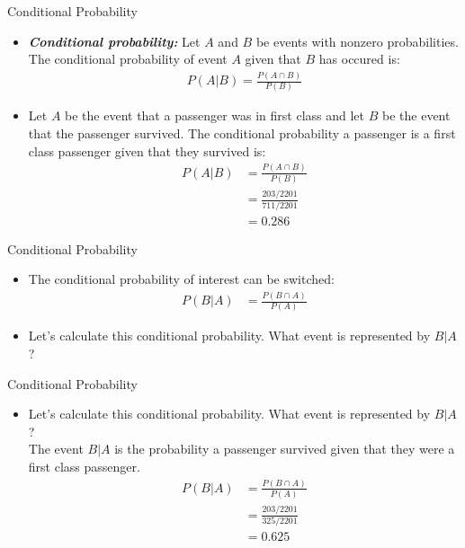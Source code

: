 \documentclass[xcolor=dvipsnames]{beamer}
\begin{document}
\begin{frame}{Conditional Probability}
	\begin{itemize}
		\item \textbf{\emph{Conditional probability:}} Let $A$ and $B$ be events with nonzero probabilities. The conditional probability of event $A$ given that $B$ has occured is:
		\begin{gather*}
		P(A|B) = \frac{P(A \cap B)}{P(B)}
		\end{gather*}
		\item Let $A$ be the event that a passenger was in first class and let $B$ be the event that the passenger survived. The conditional probability a passenger is a first class passenger given that they survived is:
		\begin{align*}
		P(A|B) &= \frac{P(A \cap B)}{P(B)} \\
		&=\frac{203 / 2201}{711 / 2201}\\ 
		&= 0.286
		\end{align*}
	\end{itemize}
\end{frame}

\begin{frame}{Conditional Probability}
\begin{itemize}
	\item The conditional probability of interest can be switched: 
	\begin{align*}
	P(B|A) &= \frac{P(B \cap A)}{P(A)}
	\end{align*}
	\item Let's calculate this conditional probability. What event is represented by $B|A$?
\end{itemize}
\end{frame}

\begin{frame}{Conditional Probability}
\begin{itemize}
	\item Let's calculate this conditional probability. What event is represented by $B|A$? \\
	
	The event $B|A$ is the probability a passenger survived given that they were a first class passenger.
	\begin{align*}
	P(B|A) &= \frac{P(B \cap A)}{P(A)} \\
	&= \frac{203 / 2201}{325 / 2201} \\
	&=  0.625
	\end{align*}
\end{itemize}
\end{frame}
\end{document}
